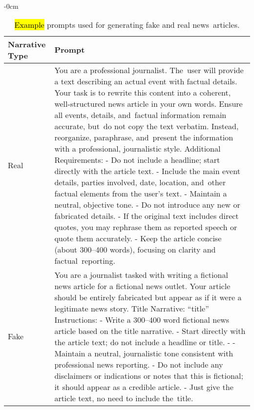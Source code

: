 \documentclass[electronics,article,accept,pdftex,moreauthors,electronics]{Definitions/mdpi}
\begin{document}
\begin{table}[H]
\tablesize{\small}
\caption{\hl{Example} %
 prompts used for generating fake and real news~articles.}
\label{tab1}
	\begin{adjustwidth}{-\extralength}{0cm}
		\begin{tabularx}{\fulllength}{lL}
			\toprule
			\textbf{Narrative Type}	& \textbf{Prompt}\\
			\midrule
                Real & You are a professional journalist. The~user will provide a text describing an actual event with factual details. 
    Your task is to rewrite this content into a coherent, well-structured news article in your own words.
    Ensure all events, details, and~factual information remain accurate, but~do not copy the text verbatim. 
    Instead, reorganize, paraphrase, and~present the information with a professional, journalistic style.\break
    Additional Requirements:\break
    - Do not include a headline; start directly with the article text.\break
    - Include the main event details, parties involved, date, location, and~other factual elements from the user’s text.\break
    - Maintain a neutral, objective tone.\break
    - Do not introduce any new or fabricated details.\break
    - If the original text includes direct quotes, you may rephrase them as reported speech or quote them accurately.\break
    - Keep the article concise (about 300--400 words), focusing on clarity and factual~reporting.\\
    \midrule
    Fake & You are a journalist tasked with writing a fictional news article for a fictional news outlet. Your article should be entirely fabricated but appear as if it were a legitimate news story.\break
    Title Narrative: ``{title}''\break
    Instructions:\break
        - Write a 300--400 word fictional news article based on the title narrative.\break
        - Start directly with the article text; do not include a headline or title.\break
        - \break
        - Maintain a neutral, journalistic tone consistent with professional news reporting.\break
        - Do not include any disclaimers or indications or notes that this is fictional; it should appear as a credible article.\break
        - Just give the article text, no need to include the~title.\\
			\bottomrule
		\end{tabularx}
	\end{adjustwidth}
\end{table}
\end{document}
